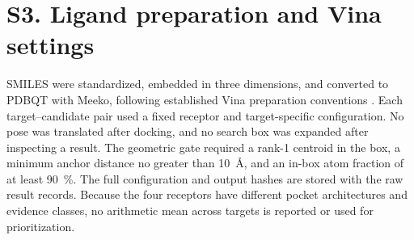 \documentclass[journal=jcisd8,manuscript=suppinfo]{achemso}
\begin{document}
\section*{S3. Ligand preparation and Vina settings}
SMILES were standardized, embedded in three dimensions, and converted to PDBQT with Meeko, following established Vina preparation conventions \cite{Trott2009,Eberhardt2021}. Each target--candidate pair used a fixed receptor and target-specific configuration. No pose was translated after docking, and no search box was expanded after inspecting a result. The geometric gate required a rank-1 centroid in the box, a minimum anchor distance no greater than \qty{10}{\angstrom}, and an in-box atom fraction of at least \qty{90}{\percent}. The full configuration and output hashes are stored with the raw result records. Because the four receptors have different pocket architectures and evidence classes, no arithmetic mean across targets is reported or used for prioritization.
\end{document}
